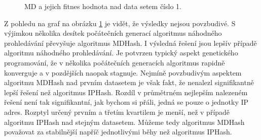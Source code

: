 \begin{figure}[!ht]
	\centering
	\caption{MD a jejich fitnes hodnota nad data setem číslo 1.}
	\label{fig:MDComparison1}
\end{figure}

Z pohledu na graf na obrázku \ref{fig:MDComparison1} je vidět, že výsledky nejsou povzbudivé. S výjimkou několika desítek počátečních
generací algoritmus náhodného prohledávání
převyšuje algoritmus MDHash. I výsledná řešení jsou lepšív případě algoritmu náhodného prohledávání. Je potvrzen typický aspekt genetického
programování, že v několika počátečních generacích algoritmus rapidně konverguje a v pozdějších naopak stagnuje. Nejmíně povzbudivým aspektem
algoritmu MDHash nad prvním datasetem je však fakt, že nenalezl signifikantně lepší řešení než algoritmus IPHash. Rozdíl v průmětrném nejlepším
nalezeném řešení není tak signifikantní, jak bychom si přáli, jedná se pouze o jednotky IP adres. Rozptyl určený prvním a třetím kvartilem je menší,
než v případě algoritmu IPHash nad stejným datasetem. Můžeme tedy algoritmus MDHash považovat za stabilnější napříč jednotlivými běhy než
algoritmus IPHash.


